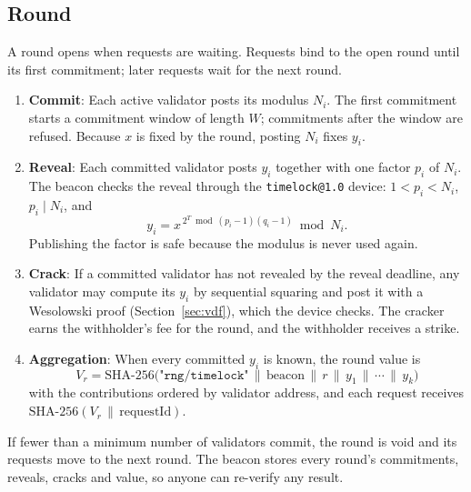 \subsection{Round}\label{sec:round}

A round opens when requests are waiting. Requests bind to the open round until its first commitment; later requests wait for the next round.

\begin{enumerate}
    \item \textbf{Commit}: Each active validator posts its modulus $N_i$. The first commitment starts a commitment window of length $W$; commitments after the window are refused. Because $x$ is fixed by the round, posting $N_i$ fixes $y_i$.

    \item \textbf{Reveal}: Each committed validator posts $y_i$ together with one factor $p_i$ of $N_i$. The beacon checks the reveal through the \texttt{timelock@1.0} device: $1 < p_i < N_i$, $p_i \mid N_i$, and
    \begin{equation}
        y_i = x^{\,2^T \bmod (p_i-1)(q_i-1)} \bmod N_i .
    \end{equation}
    Publishing the factor is safe because the modulus is never used again.

    \item \textbf{Crack}: If a committed validator has not revealed by the reveal deadline, any validator may compute its $y_i$ by sequential squaring and post it with a Wesolowski proof (Section~\ref{sec:vdf}), which the device checks. The cracker earns the withholder's fee for the round, and the withholder receives a strike.

    \item \textbf{Aggregation}: When every committed $y_i$ is known, the round value is
    \begin{equation}
        V_r = \text{SHA-256}\big(\texttt{"rng/timelock"} \,\|\, \text{beacon} \,\|\, r \,\|\, y_{1} \,\|\, \cdots \,\|\, y_{k}\big)
    \end{equation}
    with the contributions ordered by validator address, and each request receives $\text{SHA-256}(V_r \,\|\, \text{requestId})$.
\end{enumerate}

If fewer than a minimum number of validators commit, the round is void and its requests move to the next round. The beacon stores every round's commitments, reveals, cracks and value, so anyone can re-verify any result.

